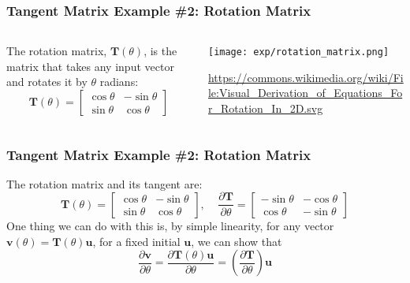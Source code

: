 \documentclass{beamer}
\begin{document}
\begin{frame}
  \frametitle{Tangent Matrix Example \#2: Rotation Matrix}
  \begin{columns}
    \begin{column}{0.5\textwidth}
      The rotation matrix, $\mathbf{T}(\theta)$, is the matrix that
      takes any input vector and rotates it by $\theta$ radians:
      \begin{displaymath}
        \mathbf{T}(\theta)=
        \left[\begin{array}{cc}
            \cos\theta & -\sin\theta\\
            \sin\theta & \cos\theta
          \end{array}\right]
      \end{displaymath}
    \end{column}
    \begin{column}{0.5\textwidth}
      \centerline{\texttt{[image: exp/rotation\_matrix.png]}}
      \url{https://commons.wikimedia.org/wiki/File:Visual_Derivation_of_Equations_For_Rotation_In_2D.svg}
    \end{column}
  \end{columns}
\end{frame}

\begin{frame}
  \frametitle{Tangent Matrix Example \#2: Rotation Matrix}
  The rotation matrix and its tangent are:
  \begin{displaymath}
    \mathbf{T}(\theta)=
    \left[\begin{array}{cc}
        \cos\theta & -\sin\theta\\
        \sin\theta & \cos\theta
      \end{array}\right],~~~~~
    \frac{\partial\mathbf{T}}{\partial\theta}= 
    \left[\begin{array}{cc}
        -\sin\theta & -\cos\theta\\
        \cos\theta & -\sin\theta
      \end{array}\right]
  \end{displaymath}
  One thing we can do with this is, by simple linearity, for any
  vector $\mathbf{v}(\theta)=\mathbf{T}(\theta)\mathbf{u}$, for a
  fixed initial $\mathbf{u}$, we can show that
  \begin{displaymath}
    \frac{\partial\mathbf{v}}{\partial\theta} =
    \frac{\partial\mathbf{T}(\theta)\mathbf{u}}{\partial\theta} =
    \left(\frac{\partial\mathbf{T}}{\partial\theta}\right)\mathbf{u}
  \end{displaymath}
\end{frame}
\end{document}

